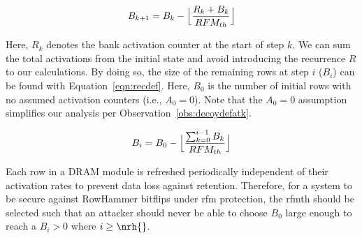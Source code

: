 \begin{equation}
\label{eqn:recinit}
B_{k+1} = B_{k} - \Bigl\lfloor
\frac{
R_{k} + B_{k}
}{
RFM_{th}
} \Bigr\rfloor
\end{equation}

Here, $R_{k}$ denotes the bank activation counter at the start of step $k$. We can sum the total activations from the initial state and avoid introducing the recurrence $R$ to our calculations.
By doing so, the size of the remaining rows at step $i$ ($B_{i}$) can be found with Equation~\ref{eqn:recdef}. Here, $B_{0}$ is the number of initial rows with no assumed activation counters (i.e., $A_{0} = 0$). Note that the $A_{0} = 0$ assumption simplifies our analysis per Observation~\ref{obs:decoydefatk}.

\begin{equation}
\label{eqn:recdef}
B_{i} = B_{0} - \Bigl\lfloor
\frac{
\sum_{k=0}^{i-1} B_{k}
}{
RFM_{th}
} \Bigr\rfloor
\end{equation}

Each row in a DRAM module is refreshed periodically independent of their activation rates to prevent data loss against retention.
Therefore, for a system to be secure against RowHammer bitflips under \gls{rfm} protection, the \gls{rfmth} should be selected such that an attacker should never be able to choose $B_{0}$ large enough to reach a $B_{i} > 0$ where $i \geq \nrh{}$.



